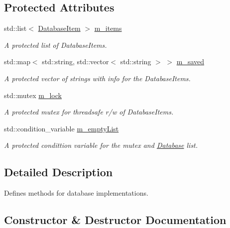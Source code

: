 \subsection*{Protected Attributes}
\begin{DoxyCompactItemize}
\item 
std\+::list$<$ \hyperlink{classDatabaseItem}{Database\+Item} $>$ \hyperlink{classDatabase_a5a4ac1f3bf0f5fd77a696174ad9e5c45}{m\+\_\+items}
\begin{DoxyCompactList}\small\item\em A protected list of Database\+Items. \end{DoxyCompactList}\item 
std\+::map$<$ std\+::string, std\+::vector$<$ std\+::string $>$ $>$ \hyperlink{classDatabase_a9f87cbe5a1be71d541083dffa8d8c9ad}{m\+\_\+saved}
\begin{DoxyCompactList}\small\item\em A protected vector of strings with info for the Database\+Items. \end{DoxyCompactList}\item 
std\+::mutex \hyperlink{classDatabase_a7f55f3a5d93c9694ee4f08a2f2135b1d}{m\+\_\+lock}
\begin{DoxyCompactList}\small\item\em A protected mutex for threadsafe r/w of Database\+Items. \end{DoxyCompactList}\item 
std\+::condition\+\_\+variable \hyperlink{classDatabase_a2ad8bf38964b3e18a0e168437acbdb27}{m\+\_\+empty\+List}
\begin{DoxyCompactList}\small\item\em A protected condittion variable for the mutex and \hyperlink{classDatabase}{Database} list. \end{DoxyCompactList}\end{DoxyCompactItemize}


\subsection{Detailed Description}
Defines methods for database implementations. 



\subsection{Constructor \& Destructor Documentation}
\mbox{\label{classDatabase_aa57fbada3001c2db58a0ca6c7071bd18}} 
